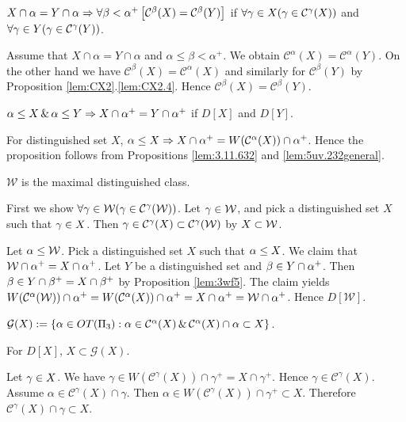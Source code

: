 \documentclass{article}
\begin{document}
\begin{proposition}\label{lem:5uv.232general}
$X\cap\alpha=Y\cap\alpha \Rightarrow \forall\beta<\alpha^{+}
\left[\mathcal{C}^{\beta}(X)=\mathcal{C}^{\beta}(Y)\right]$
if $\forall\gamma\in X(\gamma\in\mathcal{C}^{\gamma}(X))$ and $\forall\gamma\in Y(\gamma\in\mathcal{C}^{\gamma}(Y))$.
\end{proposition}
\bprf
Assume that $X\cap\alpha=Y\cap\alpha$ and $\alpha\leq\beta<\alpha^{+}$.
We obtain $\mathcal{C}^{\alpha}(X)=\mathcal{C}^{\alpha}(Y)$.
On the other hand we have $\mathcal{C}^{\beta}(X)=\mathcal{C}^{\alpha}(X)$ and similarly for 
$\mathcal{C}^{\beta}(Y)$
by Proposition \ref{lem:CX2}.\ref{lem:CX2.4}.
Hence $\mathcal{C}^{\beta}(X)=\mathcal{C}^{\beta}(Y)$.
\eprf


\begin{proposition}\label{lem:3wf5}
$\alpha\leq X \,\&\, \alpha\leq Y \Rightarrow X\cap\alpha^{+}=Y\cap\alpha^{+}$
if $D[X]$ and $D[Y]$.
\end{proposition}
\bprf
For distinguished set $X$, $\alpha\leq X \Rightarrow X\cap\alpha^{+}=W(\mathcal{C}^{\alpha}(X))\cap\alpha^{+}$.
Hence the proposition follows from
Propositions \ref{lem:3.11.632} and \ref{lem:5uv.232general}.
\eprf

\begin{proposition}\label{lem:3wf6max}
$\mathcal{W}$ is the maximal distinguished class.
\end{proposition}
\bprf
First we show $\forall\gamma\in{\cal W}(\gamma\in\mathcal{C}^{\gamma}({\cal W}))$.
Let $\gamma\in{\cal W}$, and pick a distinguished set $X$ such that $\gamma\in X$.
Then $\gamma\in\mathcal{C}^{\gamma}(X)\subset\mathcal{C}^{\gamma}({\cal W})$ by $X\subset{\cal W}$.

Let $\alpha\leq{\cal W}$. Pick a distinguished set $X$ such that $\alpha\leq X$.
We claim that ${\cal W}\cap\alpha^{+}=X\cap\alpha^{+}$.
Let $Y$ be a distinguished set and $\beta\in Y\cap\alpha^{+}$.
Then $\beta\in Y\cap\beta^{+}=X\cap\beta^{+}$ by Proposition \ref{lem:3wf5}.
The claim yields
$W(\mathcal{C}^{\alpha}({\cal W}))\cap\alpha^{+}=W(\mathcal{C}^{\alpha}(X))\cap\alpha^{+}=
X\cap\alpha^{+}={\cal W}\cap\alpha^{+}$.
Hence $D[\mathcal{W}]$.
\eprf

\begin{definition}\label{df:calg}
$\mathcal{G}(X):=\{\alpha\in OT(\Pi_{3}) :\alpha\in \mathcal{C}^{\alpha}(X) \,\&\,
 \mathcal{C}^{\alpha}(X)\cap\alpha\subset X\}$.
\end{definition}

\begin{lemma}\label{lem:wf5.332}
For $D[X]$,
$X\subset\mathcal{G}(X)$.
\end{lemma}
\bprf
Let $\gamma\in X$.
We have $\gamma\in W(\mathcal{C}^{\gamma}(X))\cap\gamma^{+}=X\cap\gamma^{+}$.
Hence $\gamma\in\mathcal{C}^{\gamma}(X)$.
Assume $\alpha\in\mathcal{C}^{\gamma}(X)\cap\gamma$. 
Then $\alpha\in W(\mathcal{C}^{\gamma}(X))\cap\gamma^{+}\subset X$. 
Therefore
$\mathcal{C}^{\gamma}(X)\cap\gamma\subset X$.
\eprf
\end{document}
